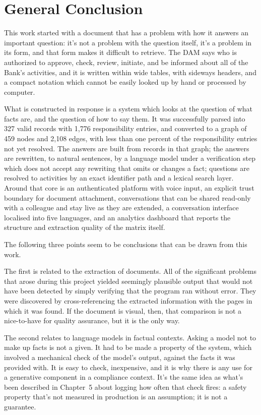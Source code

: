\chapter*{General Conclusion}

This work started with a document that has a problem with how it answers an important question: it's not a problem with the question itself, it's a problem in its form, and that form makes it difficult to retrieve. The DAM says who is authorized to approve, check, review, initiate, and be informed about all of the Bank's activities, and it is written within wide tables, with sideways headers, and a compact notation which cannot be easily looked up by hand or processed by computer.

What is constructed in response is a system which looks at the question of what facts are, and the question of how to say them. It was successfully parsed into 327 valid records with 1,776 responsibility entries, and converted to a graph of 459 nodes and 2,108 edges, with less than one percent of the responsibility entries not yet resolved. The answers are built from records in that graph; the answers are rewritten, to natural sentences, by a language model under a verification step which does not accept any rewriting that omits or changes a fact; questions are resolved to activities by an exact identifier path and a lexical search layer. Around that core is an authenticated platform with voice input, an explicit trust boundary for document attachment, conversations that can be shared read-only with a colleague and stay live as they are extended, a conversation interface localised into five languages, and an analytics dashboard that reports the structure and extraction quality of the matrix itself.

The following three points seem to be conclusions that can be drawn from this work.

The first is related to the extraction of documents. All of the significant problems that arose during this project yielded seemingly plausible output that would not have been detected by simply verifying that the program ran without error. They were discovered by cross-referencing the extracted information with the pages in which it was found. If the document is visual, then, that comparison is not a nice-to-have for quality assurance, but it is the only way.

The second relates to language models in factual contexts. Asking a model not to make up facts is not a given. It had to be made a property of the system, which involved a mechanical check of the model's output, against the facts it was provided with. It is easy to check, inexpensive, and it is why there is any use for a generative component in a compliance context. It's the same idea as what's been described in Chapter~5 about logging how often that check fires: a safety property that's not measured in production is an assumption; it is not a guarantee.

